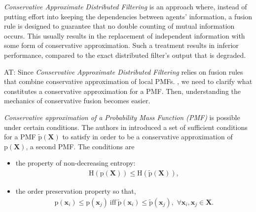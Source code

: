 \documentclass[conference]{IEEEtran}
\newcommand{\vect}[1]{{\mathbf{#1}}}
\theoremstyle{remark}
\newcommand{\axx}[1]{{\color{blue} AT: #1  \ }}  %
\newcommand{\pr}{\textrm{p}}
\begin{document}
\emph{Conservative Approximate Distributed Filtering} is an approach where, 
instead of putting effort into keeping the dependencies between agents' 
information, a fusion rule is designed to guarantee that no double counting of 
mutual information occurs. This usually results in the replacement of 
independent information with some form of conservative approximation. Such a 
treatment results in inferior performance, compared to the exact distributed 
filter's output that is degraded. 

\axx{ Since \emph{Conservative Approximate Distributed Filtering} 
relies on fusion rules that combine conservative approximation of local PMFs. 
, we need to clarify what constitutes a conservative approximation for a 
PMF. Then, understanding the mechanics of conservative fusion becomes easier. }

\emph{Conservative approximation of a Probability Mass Function (PMF)} is 
possible under certain conditions. The authors in \cite{bailey2012conservative} 
introduced a set of sufficient conditions for a PMF $\tilde{\pr}(\vect{X})$ to 
satisfy in order to be a conservative approximation of $\pr(\vect{X})$, a 
second PMF. The conditions are
\begin{itemize}
\item the property of non-decreasing entropy:
$$\begin{aligned}
\text{H}(\pr(\vect{X})) \leq \text{H}(\tilde{\pr}(\vect{X})),
\end{aligned}$$
\item the order preservation property so that,
$$\begin{aligned}
\pr(\vect{x}_i) \leq \pr(\vect{x}_j) \ \text{iff}\  \tilde{\pr}(\vect{x}_i) \leq \tilde{\pr}(\vect{x}_j), \,\, \forall \vect{x}_i,\vect{x}_j\in\vect{X}.
\end{aligned}$$
\end{itemize}
\end{document}
